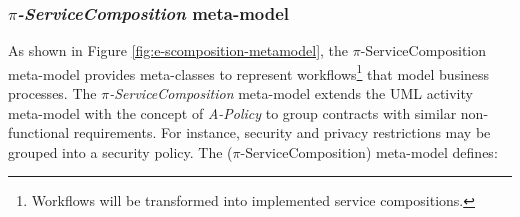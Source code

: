 \subsubsection{\textit{$\pi$-ServiceComposition} meta-model}%

As shown in Figure \ref{fig:e-scomposition-metamodel}, the $\pi$-Serv\-ice\-Com\-po\-si\-tion meta-model 
provides meta-classes to represent workflows\footnote{Workflows will be transformed into implemented service compositions.} that model  business processes.
The \textit{$\pi$-Serv\-ice\-Com\-po\-si\-tion} meta-model extends the UML activity  meta-model with the concept of  \textit{A-Policy}
to group contracts with similar non-functional requirements.
For instance, security and privacy restrictions may be grouped into a security policy.
 The  ($\pi$-Serv\-ice\-Com\-po\-si\-tion) meta-model defines:
